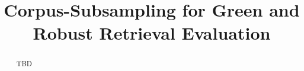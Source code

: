 \title{Corpus-Subsampling for Green and Robust Retrieval Evaluation}


\maketitle

\begin{abstract}
TBD

\end{abstract}
